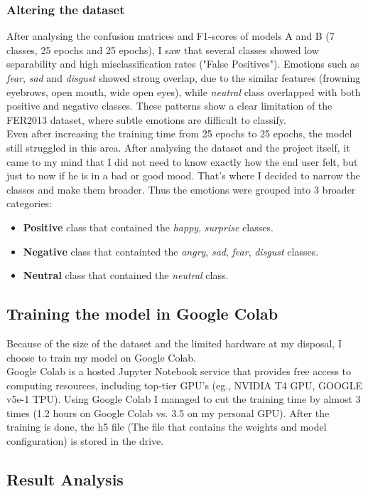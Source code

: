 \documentclass[12pt,a4paper]{article}
\begin{document}
\subsubsection{Altering the dataset}
After analysing the confusion matrices and F1-scores of models A and B (7 classes, 25 epochs and 25 epochs), I saw that several classes showed low separability and high misclassification rates ("False Positives"). Emotions such as \emph{fear}, \emph{sad} and \emph{disgust} showed strong overlap, due to the similar features (frowning eyebrows, open mouth, wide open eyes), while \emph{neutral} class overlapped with both positive and negative classes. These patterns show a clear limitation of the FER2013 dataset, where subtle emotions are difficult to classify. \\
Even after increasing the training time from 25 epochs to 25 epochs, the model still struggled in this area. After analysing the dataset and the project itself, it came to my mind that I did not need to know exactly how the end user felt, but just to now if he is in a bad or good mood. That's where I decided to narrow the classes and make them broader. Thus the emotions were grouped into 3 broader categories:
\begin{itemize}
\item \textbf{Positive} class that contained the \emph{happy}, \emph{surprise} classes.
\item \textbf{Negative} class that containted the \emph{angry}, \emph{sad}, \emph{fear}, \emph{disgust} classes.
\item \textbf{Neutral} class that contained the \emph{neutral} class.
\end{itemize}
\subsection{Training the model in Google Colab}
Because of the size of the dataset and the limited hardware at my disposal, I choose to train my model on Google Colab. \\
Google Colab is a hosted Jupyter Notebook service that provides free access to computing resources, including top-tier GPU's (eg., NVIDIA T4 GPU, GOOGLE v5e-1 TPU). Using Google Colab I managed to cut the training time by almost 3 times (1.2 hours on Google Colab vs. 3.5 on my personal GPU). After the training is done, the h5 file (The file that contains the weights and model configuration) is stored in the drive.
\subsection{Result Analysis}
\end{document}

